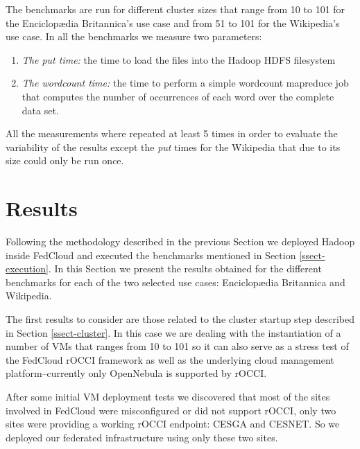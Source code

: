 \documentclass[oribibl]{llncs_Ibergrid2013}
\begin{document}
The benchmarks are run for different cluster sizes that range from 10 to 101 for the Enciclop{\ae}dia Britannica's use case and from 51 to 101 for the Wikipedia's use case. In all the benchmarks we measure two parameters:
\begin{enumerate}
\item \emph{The put time:} the time to load the files into the Hadoop HDFS filesystem 
\item \emph{The wordcount time:} the time to perform a simple wordcount mapreduce job that computes the number of occurrences of each word over the complete data set. 
\end{enumerate}
All the measurements where repeated at least 5 times in order to evaluate the variability of the results except the \emph{put} times for the Wikipedia that due to its size could only be run once.

\section{Results}
\label{sect-results}

Following the methodology described in the previous Section we deployed Hadoop inside FedCloud and executed the benchmarks mentioned in Section \ref{ssect-execution}. In this Section we present the results obtained for the different benchmarks for each of the two selected use cases: Enciclop{\ae}dia Britannica and Wikipedia.

The first results to consider are those related to the cluster startup step described in Section \ref{ssect-cluster}. In this case we are dealing with the instantiation of a number of VMs that ranges from 10 to 101 so it can also serve as a stress test of the FedCloud rOCCI framework as well as the underlying cloud management platform--currently only OpenNebula is supported by rOCCI.

After some initial VM deployment tests we discovered that most of the sites involved in FedCloud were misconfigured or did not support rOCCI, only two sites were providing a working rOCCI endpoint: CESGA and CESNET. So we deployed our federated infrastructure using only these two sites.
\end{document}
